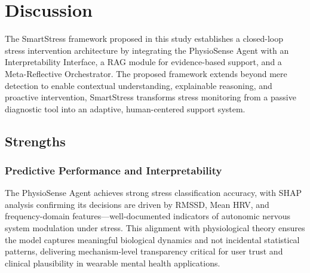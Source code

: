 \documentclass[journal,twoside,web]{ieeecolor}
\begin{document}

\section{Discussion}
\label{sec:discussion}
The SmartStress framework proposed in this study establishes a closed-loop stress intervention architecture by integrating the PhysioSense Agent with an Interpretability Interface, a RAG module for evidence-based support, and a Meta-Reflective Orchestrator. The proposed framework extends beyond mere detection to enable contextual understanding, explainable reasoning, and proactive intervention, SmartStress transforms stress monitoring from a passive diagnostic tool into an adaptive, human-centered support system.

\subsection{Strengths}
\subsubsection{Predictive Performance and Interpretability}

The PhysioSense Agent achieves strong stress classification accuracy, with SHAP analysis confirming its decisions are driven by RMSSD, Mean HRV, and frequency-domain features—well-documented indicators of autonomic nervous system modulation under stress. This alignment with physiological theory ensures the model captures meaningful biological dynamics and not incidental statistical patterns, delivering mechanism-level transparency critical for user trust and clinical plausibility in wearable mental health applications.
\end{document}
